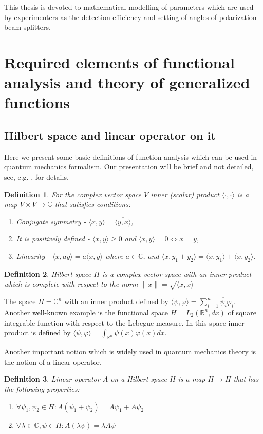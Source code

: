 \documentclass[11pt]{article}
\newtheorem{definition}{Definition}[section]
\begin{document}
This thesis is devoted to mathematical modelling of parameters which are used by experimenters as the detection efficiency and setting of angles of polarization beam splitters.

\section{Required elements of functional analysis and theory of generalized functions}
\subsection{Hilbert space and linear operator on it}
Here we present some basic definitions of function analysis which can be used in quantum mechanics formalism. Our presentation will be brief and not detailed, see, e.g. \cite{advanced_la}, for details.

\begin{definition}
For the complex vector space $V$ inner (scalar) product $\langle\cdot,\cdot\rangle$ is a map $V\times V \to \mathbb{C}$ that satisfies conditions:
\begin{enumerate}
\item Conjugate symmetry - $\langle x, y\rangle = \overline{\langle y, x\rangle}$,
\item It is positively defined - $\langle x, y\rangle \geq 0$ and $\langle x, y\rangle = 0 \Leftrightarrow x = y$,
\item Linearity - $\langle x, ay\rangle = a\langle x, y\rangle$ where $a\in\mathbb{C}$, and $\langle x, y_1 + y_2\rangle = \langle x, y_1\rangle + \langle x, y_2\rangle$.
\end{enumerate}
\end{definition}

\begin{definition}
Hilbert space $H$ is a complex vector space with an inner product which is complete with respect to the norm $\|x\| = \sqrt{\langle x, x\rangle}$
\end{definition}

The space $H = \mathbb{C}^n$ with an inner product defined by $\langle\psi, \varphi \rangle = \sum_{i = 1}^n \overline{\psi_i}\varphi_i$. Another well-known example is the functional space $H = L_2(\mathbb{R}^n, dx)$ of square integrable function with respect to the Lebegue measure. In this space inner product is defined by $\langle\psi, \varphi \rangle = \int_{\mathbb{R}^n}\overline{\psi(x)}\varphi(x) dx$.

Another important notion which is widely used in quantum mechanics theory is the notion of a linear operator.
\begin{definition}
Linear operator $A$ on a Hilbert space $H$ is a map $H \to H$ that has the following properties:
\begin{enumerate}
\item $\forall \psi_1,\psi_2\in H: A(\psi_1 + \psi_2) = A\psi_1 + A\psi_2 $
\item $\forall\lambda\in\mathbb{C}, \psi\in H: A(\lambda\psi) = \lambda A\psi$
\end{enumerate}
\end{definition}
\end{document}
